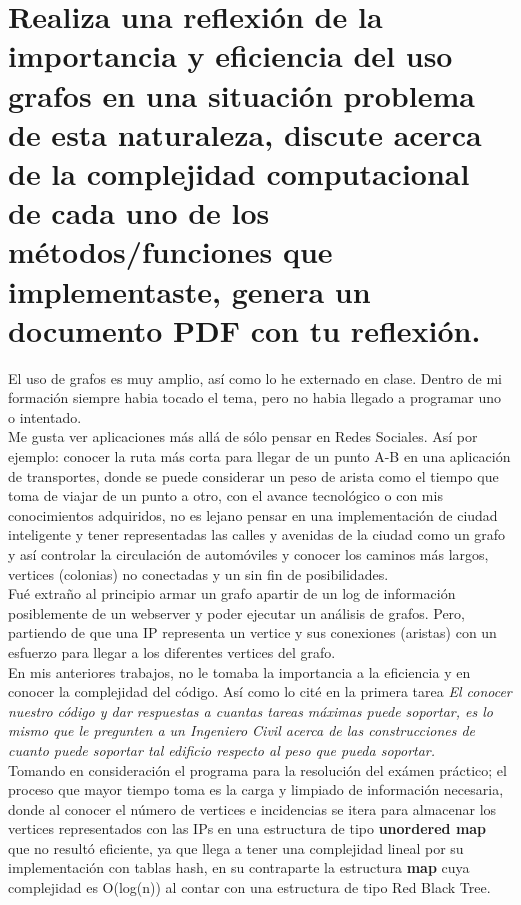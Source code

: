 \documentclass{article}
\begin{document}
\section{Realiza una reflexión de la importancia y eficiencia del uso grafos en una situación problema de esta naturaleza, discute acerca de la complejidad computacional de cada uno de los métodos/funciones que implementaste, genera un documento PDF con tu reflexión.}

  El uso de grafos es muy amplio, así como lo he externado en clase. Dentro de mi formación siempre habia tocado el tema, pero no habia llegado a programar uno o intentado.\\

  Me gusta ver aplicaciones más allá de sólo pensar en Redes Sociales. Así por ejemplo: conocer la ruta más corta para llegar de un punto A-B en una aplicación de transportes, donde se puede considerar un peso de arista como el tiempo que toma de viajar de un punto a otro, con el avance tecnológico o con mis conocimientos adquiridos, no es lejano pensar en una implementación de ciudad inteligente y tener representadas las calles y avenidas de la ciudad como un grafo y así controlar la circulación de automóviles y conocer los caminos más largos, vertices (colonias) no conectadas y un sin fin de posibilidades.\\

  Fué extraño al principio armar un grafo apartir de un log de información posiblemente de un webserver y poder ejecutar un análisis de grafos. Pero, partiendo de que una IP representa un vertice y sus conexiones (aristas) con un esfuerzo para llegar a los diferentes vertices del grafo.\\

  En mis anteriores trabajos, no le tomaba la importancia a la eficiencia y en conocer la complejidad del código. Así como lo cité en la primera tarea \textit{El conocer nuestro código y dar respuestas a cuantas tareas máximas puede soportar, es lo mismo que le pregunten a un Ingeniero Civil acerca de las construcciones de cuanto puede soportar tal edificio respecto al peso que pueda soportar.}\\

  Tomando en consideración el programa para la resolución del exámen práctico; el proceso que mayor tiempo toma es la carga y limpiado de información necesaria, donde al conocer el número de vertices e incidencias se itera para almacenar los vertices representados con las IPs en una estructura de tipo \textbf{unordered map} que no resultó eficiente, ya que llega a tener una complejidad lineal por su implementación con tablas hash, en su contraparte la estructura \textbf{map} cuya complejidad es O(log(n)) al contar con una estructura de tipo Red Black Tree.\\
\end{document}

